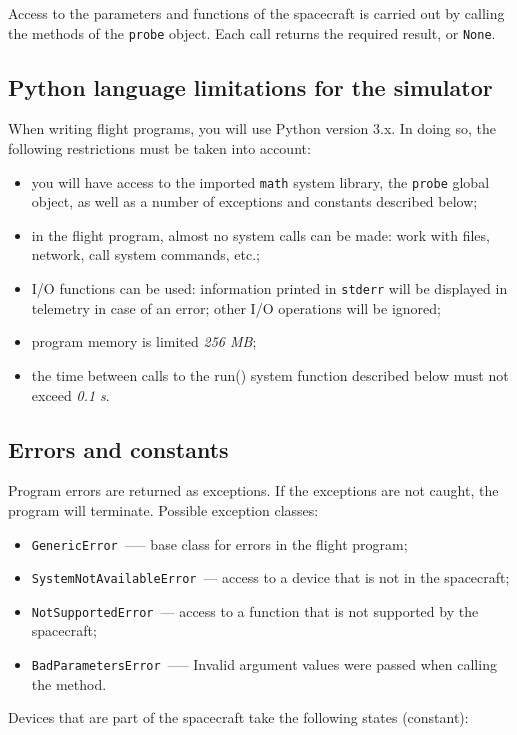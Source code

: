 \documentclass[12pt,a4paper]{article}
\begin{document}
Access to the parameters and functions of the spacecraft is carried out by calling the methods of the \verb'probe' object. Each call returns the required result, or \verb'None'.

\subsection*{Python language limitations for the simulator}

When writing flight programs, you will use Python version 3.x. In doing so, the following restrictions must be taken into account:

\begin{itemize}
   \item you will have access to the imported \verb'math' system library, the \verb'probe' global object, as well as a number of exceptions and constants described below;
   \item in the flight program, almost no system calls can be made: work with files, network, call system commands, etc.;
   \item I/O functions can be used: information printed in \verb'stderr' will be displayed in telemetry in case of an error; other I/O operations will be ignored;
   \item program memory is limited \emph{256 MB};
   \item the time between calls to the run() system function described below must not exceed \emph{0.1 s}.
\end{itemize}

\subsection*{Errors and constants}

Program errors are returned as exceptions. If the exceptions are not caught, the program will terminate. Possible exception classes:

\begin{itemize}
\item \verb'GenericError'~--— base class for errors in the flight program;
\item \verb'SystemNotAvailableError'~--- access to a device that is not in the spacecraft;

\item \verb'NotSupportedError'~--- access to a function that is not supported by the spacecraft;
\item \verb'BadParametersError'~--— Invalid argument values were passed when calling the method.
\end{itemize}
Devices that are part of the spacecraft take the following states (constant):
\end{document}

